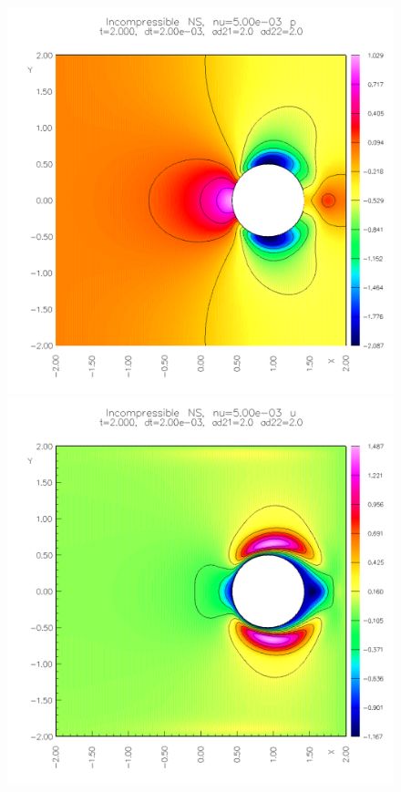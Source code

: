 {\begin{figure}
\begin{center}
\includegraphics[width=\figWidth]{figures/collide6-p-2p0}  
\includegraphics[width=\figWidth]{figures/collide6-u-2p0}  

\end{center}
\end{figure}}
